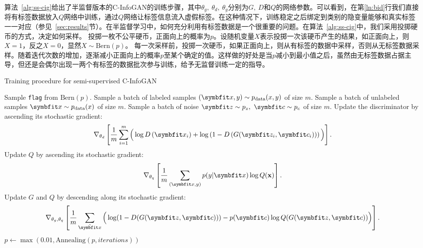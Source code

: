 算法~\ref{alg:ss-cig}给出了半监督版本的C-InfoGAN的训练步骤，其中$\theta_g, ~\theta_d, ~\theta_g$分别为$G, ~D$和$Q$的网络参数。可以看到，在第\ref{ln:bid}行我们直接将有标签数据放入$Q$网络中训练，通过$Q$网络让标签信息流入虚假标签。在这种情况下，训练稳定之后绑定到类别的隐变量能够和真实标签一一对应（参见~\ref{sec:results}节）。在半监督学习中，如何充分利用有标签数据是一个很重要的问题。在算法~\ref{alg:ss-cig}中，我们采用投掷硬币的方式，决定如何采样。
投掷一枚不公平硬币，正面向上的概率为$p$。设随机变量$X$表示投掷一次该硬币产生的结果，如正面向上，则$X=1$，反之$X=0$，显然$X\sim\text{Bern}(p)$。
每一次采样前，投掷一次硬币，如果正面向上，则从有标签的数据中采样，否则从无标签数据采样。随着迭代次数的增加，逐渐减小正面向上的概率$p$至某个确定的值。这样做的好处是当$p$减小到最小值之后，虽然由无标签数据占据主导，但还是会偶尔出现一两个有标签的数据批次参与训练，给予无监督训练一定的指导。
\begin{algorithm}[htbp]
  \small
  \caption{Training procedure for semi-supervised C-InfoGAN}
  \label{alg:ss-cig}
  \begin{algorithmic}[1]
      \State Sample \texttt{flag} from $\text{Bern}(p)$.
        \State Sample a batch of labeled samples 
               $(\bd{x}, y) \sim p_{\text{data}}(x,y)$ of size $m$.
      \Else
        \State Sample a batch of unlabeled samples $\bd{x} \sim p_{\text{data}}(x)$ of
        size $m$.
      \EndIf
      \State Sample a batch of noise $\bd{z}\sim p_z, ~\bd{c}\sim p_c$ of size
      $m$.
      \State Update the discriminator by ascending its stochastic gradient:
      \[
        \nabla_{\theta_d} \left[ 
          \frac{1}{m} \sum_{i=1}^m \Big( 
            \log D\left(\bd{x}_i\right) + 
            \log\left( 1 - D\left( G(\bd{z}_i, \bd{c}_i) \right) \right)
          \Big)
        \right].
      \]
        \State Update $Q$ by ascending its stochastic gradient: \label{ln:bid}
        \[
          \nabla_{\theta_q} \left[ 
            \frac{1}{m} \sum_{(\bd{x}, y)} p(y|\bd{x}) \log Q(\bf{x}) 
          \right].
        \]
      \EndIf
      \State Update $G$ and $Q$ by descending along its stochastic gradient:
      \[
        \nabla_{\theta_g,\theta_q} \left[ 
          \frac{1}{m} \sum_{\tilde{\bd{x}}} \Big(
            \log(1 - D(G(\bd{z},\bd{c}))) -
            p(\bd{c})\log Q(G(\bd{z}, \bd{c}))
          \Big)
        \right]. \label{ln:test}
      \]
      \State $p \gets \max(0.01, \text{Annealing}(p, iterations))$ 
    \EndFor
  \end{algorithmic}
\end{algorithm}

